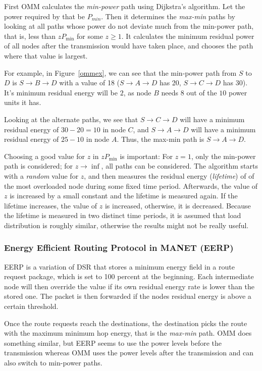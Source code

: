 First OMM calculates the \textit{min-power} path using Dijkstra’s algorithm. Let
the power required by that be $P_{min}$.
Then it determines the \textit{max-min} paths by looking at all paths whose
power do not deviate much from the min-power path, that is, less than $zP_{\min}$
for some $z \ge 1$. It calculates the minimum residual power of all nodes
after the transmission would have taken place, and chooses the path where
that value is largest.

For example, in Figure~\ref{ommex}, we can see that the min-power path from
$S$ to $D$ is $S \to B \to D$ with a value of 18 ($S \to A \to D$ has 20,
$S \to C \to D$ has 30).
It's minimum residual energy will be $2$, as node $B$ needs
$8$ out of the $10$ power units it has.

Looking at the alternate paths, we see that $S \to C \to D$ will have a
minimum residual energy of $30-20=10$ in node $C$, and $S \to A \to D$ will
have a minimum residual energy of $25-10$ in node $A$.
Thus, the max-min path is $S \to A \to D$.

Choosing a good value for $z$ in $zP_{\min}$ is important: For $z=1$, only
the min-power path is considered; for $z \to \inf$, all paths can be
considered. The algorithm starts with a \textit{random} value for $z$, and
then measures the residual energy (\textit{lifetime}) of of the most overloaded node during some
fixed time period. Afterwards, the value of $z$ is increased by a small constant
and the lifetime is measured again. If the lifetime increases, the value of $z$
is increased, otherwise, it is decreased. Because the lifetime is measured
in two distinct time periods, it is assumed that load distribution is roughly
similar, otherwise the results might not be really useful.


\subsubsection{Energy Efficient Routing Protocol in MANET (EERP)}
EERP\cite{main2} is a variation of DSR that stores a minimum energy field
in a route request package, which is set to 100 percent at the beginning. Each
intermediate node will then override the value if its own residual energy rate
is lower than the stored one. The packet is then forwarded if the nodes residual
energy is above a certain threshold.

Once the route requests reach the destinations, the destination picks the route
with the maximum minimum hop energy, that is the \textit{max-min} path. OMM
does something similar, but EERP seems to use the power
levels before the transmission whereas OMM uses the power levels after the
transmission and can also switch to min-power paths.

